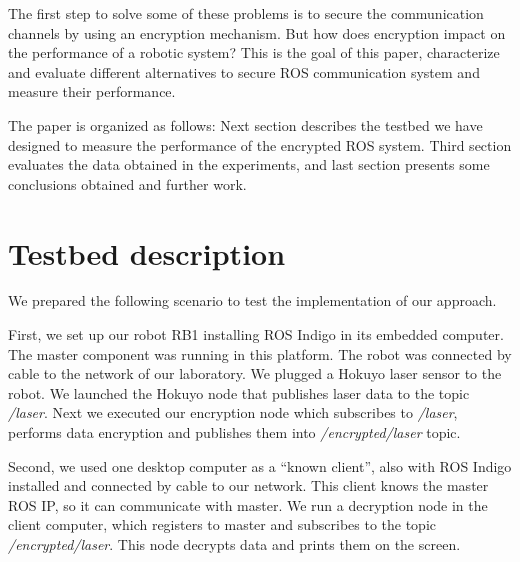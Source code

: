 \documentclass[journal,twoside]{JoPhA}
\begin{document}
The first step to solve some of these problems is to secure the communication channels by using an encryption mechanism. But how does encryption impact on the performance of a robotic system? This is the goal of this paper, characterize and evaluate different alternatives to secure ROS communication system and measure their performance.


The paper is organized as follows: Next section describes the testbed we have designed to measure the performance of the encrypted ROS system. Third section evaluates the data obtained in the experiments, and last section presents some conclusions obtained and further work.



\section{Testbed description}

 
{\color{red}{Habr'ia que contar primero qu'e se quiere medir}} 
 
We prepared the following scenario to test the implementation of our approach.


First, we set up our robot RB1 installing ROS Indigo in its embedded computer. The master component was running in this platform. The robot was connected by cable to the network of our laboratory. We plugged a Hokuyo laser sensor to the robot. We launched the Hokuyo node that publishes laser data to the topic \textit{/laser}. Next we executed our encryption node which subscribes to \textit{/laser}, performs data encryption and publishes them into \textit{/encrypted/laser} topic.

Second, we used one desktop computer as a ``known client'', also with ROS Indigo installed and connected by cable to our network. This client knows the master ROS IP, so it can communicate with master. We run a decryption node in the client computer, which registers to master and subscribes to the topic \textit{/encrypted/laser}. This node decrypts data and prints them on the screen.
\end{document}
